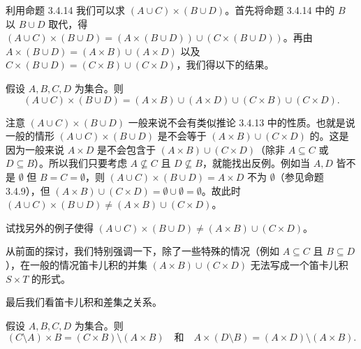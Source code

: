 利用命题 3.4.14 我们可以求 $(A \cup C) \times (B \cup D)$。首先将命题 3.4.14 中的 $B$ 以 $B \cup D$ 取代，得 $(A \cup C) \times (B \cup D) = (A \times (B \cup D)) \cup (C \times (B \cup D))$。再由 $A \times (B \cup D) = (A \times B) \cup (A \times D)$ 以及 $C \times (B \cup D) = (C \times B) \cup (C \times D)$，我们得以下的结果。

\begin{corollary}
假设 $A, B, C, D$ 为集合。则
$$ (A \cup C) \times (B \cup D) = (A \times B) \cup (A \times D) \cup (C \times B) \cup (C \times D). $$
\end{corollary}

注意 $(A \cup C) \times (B \cup D)$ 一般来说不会有类似推论 3.4.13 中的性质。也就是说一般的情形 $(A \cup C) \times (B \cup D)$ 是不会等于 $(A \times B) \cup (C \times D)$ 的。这是因为一般来说 $A \times D$ 是不会包含于 $(A \times B) \cup (C \times D)$（除非 $A \subseteq C$ 或 $D \subseteq B$）。所以我们只要考虑 $A \nsubseteq C$ 且 $D \nsubseteq B$，就能找出反例。例如当 $A, D$ 皆不是 $\emptyset$ 但 $B = C = \emptyset$，则 $(A \cup C) \times (B \cup D) = A \times D$ 不为 $\emptyset$（参见命题 3.4.9），但 $(A \times B) \cup (C \times D) = \emptyset \cup \emptyset = \emptyset$。故此时 $(A \cup C) \times (B \cup D) \neq (A \times B) \cup (C \times D)$。

\begin{question}
试找另外的例子使得 $(A \cup C) \times (B \cup D) \neq (A \times B) \cup (C \times D)$。
\end{question}

从前面的探讨，我们特别强调一下，除了一些特殊的情况（例如 $A \subseteq C$ 且 $B \subseteq D$），在一般的情况笛卡儿积的并集 $(A \times B) \cup (C \times D)$ 无法写成一个笛卡儿积 $S \times T$ 的形式。

最后我们看笛卡儿积和差集之关系。

\begin{proposition}
假设 $A, B, C, D$ 为集合。则
$$ (C \setminus A) \times B = (C \times B) \setminus (A \times B) \quad \text{和} \quad A \times (D \setminus B) = (A \times D) \setminus (A \times B). $$
\end{proposition}

